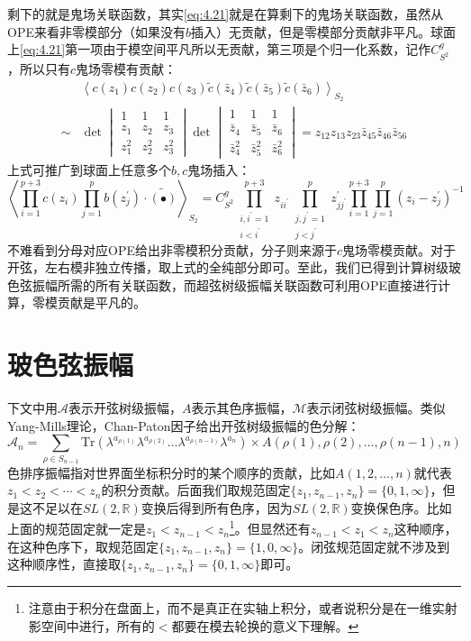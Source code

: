 剩下的就是鬼场关联函数，其实\ref{eq:4.21}就是在算剩下的鬼场关联函数，虽然从OPE来看非零模部分（如果没有$b$插入）无贡献，但是零模部分贡献非平凡。球面上\ref{eq:4.21}第一项由于模空间平凡所以无贡献，第三项是个归一化系数，记作$C^g_{S^2}$，所以只有$c$鬼场零模有贡献：
\begin{equation}
\begin{aligned}
		&\left\langle c(z_1)c(z_2)c(z_3)\tilde{c}(\bar{z}_4)\tilde{c}(\bar{z}_5)\tilde{c}(\bar{z}_6)\right\rangle_{S_2}\\
	\sim&\det\begin{vmatrix}1&1&1\\z_1&z_2&z_3\\z_1^2&z_2^2&z_3^2\end{vmatrix}\det\begin{vmatrix}1&1&1\\\bar{z}_4&\bar{z}_5&\bar{z}_6\\\bar{z}_4^2&\bar{z}_5^2&\bar{z}_6^2\end{vmatrix}=z_{12}z_{13}z_{23}\bar{z}_{45}\bar{z}_{46}\bar{z}_{56}
\end{aligned}
\end{equation}
上式可推广到球面上任意多个$b,c$鬼场插入：
\begin{equation}
	\left\langle\prod_{i=1}^{p+3}c(z_i)\prod_{j=1}^pb(z_j^{\prime})\cdot\widetilde{(\bullet)}\right\rangle_{S_2}=C^g_{S^2}\prod_{\substack{i,i^{\prime}=1\\i<i^{\prime}}}^{p+3}z_{ii^{\prime}}\prod_{\substack{j,j^{\prime}=1\\j<j^{\prime}}}^pz_{jj^{\prime}}^{\prime}\prod_{i=1}^{p+3}\prod_{j=1}^p(z_i-z_j^{\prime})^{-1}
\end{equation}
不难看到分母对应OPE给出非零模积分贡献，分子则来源于$c$鬼场零模贡献。对于开弦，左右模非独立传播，取上式的全纯部分即可。至此，我们已得到计算树级玻色弦振幅所需的所有关联函数，而超弦树级振幅关联函数可利用OPE直接进行计算，零模贡献是平凡的。
\section{玻色弦振幅}
下文中用$\mathcal{A}$表示开弦树级振幅，$A$表示其色序振幅，$\mathcal{M}$表示闭弦树级振幅。类似Yang-Mills理论，Chan-Paton因子给出开弦树级振幅的色分解：
\begin{equation}
	\mathcal{A}_n=\sum_{\rho\in S_{n-1}}\mathrm{Tr}(\lambda^{a_{\rho(1)}}\lambda^{a_{\rho(2)}}\ldots \lambda^{a_{\rho(n-1)}}\lambda^{a_{n}})\times A(\rho(1),\rho(2),\ldots,\rho(n-1),n)
\end{equation}
色排序振幅指对世界面坐标积分时的某个顺序的贡献，比如$A(1,2,\ldots,n)$就代表$z_1<z_2<\cdots<z_n$的积分贡献。后面我们取规范固定$\{z_1,z_{n-1},z_n\}=\{0,1,\infty\}$，但是这不足以在$SL(2,\mathbb{R})$变换后得到所有色序，因为$SL(2,\mathbb{R})$变换保色序。比如上面的规范固定就一定是$z_1<z_{n-1}<z_n$\footnote{注意由于积分在盘面上，而不是真正在实轴上积分，或者说积分是在一维实射影空间中进行，所有的$<$都要在模去轮换的意义下理解。}。但显然还有$z_{n-1}<z_1<z_n$这种顺序，在这种色序下，取规范固定$\{z_1,z_{n-1},z_n\}=\{1,0,\infty\}$。闭弦规范固定就不涉及到这种顺序性，直接取$\{z_1,z_{n-1},z_n\}=\{0,1,\infty\}$即可。
